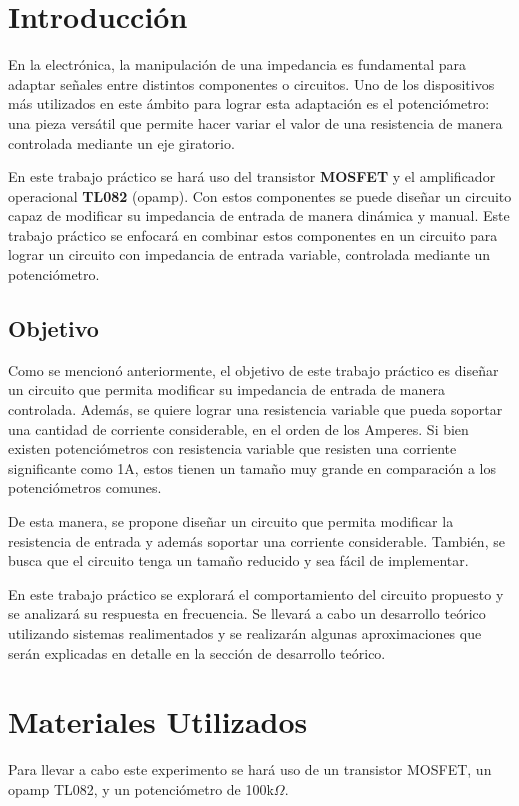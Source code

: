 \documentclass[12pt,oneside,a4paper]{article}
\begin{document}
\newpage

\tableofcontents

\newpage

\section{Introducción}
En la electrónica, la manipulación de una impedancia es fundamental para adaptar señales 
entre distintos componentes o circuitos. Uno de los dispositivos más utilizados en este ámbito 
para lograr esta adaptación es el potenciómetro: una pieza versátil que permite hacer variar el valor 
de una resistencia de manera controlada mediante un eje giratorio. 

En este trabajo práctico se hará uso del transistor \textbf{MOSFET} y el amplificador 
operacional \textbf{TL082} (opamp). Con estos componentes se puede diseñar un circuito capaz de modificar su impedancia 
de entrada de manera dinámica y manual. Este trabajo práctico se enfocará en combinar estos componentes 
en un circuito para lograr un circuito con impedancia de entrada variable, controlada mediante un potenciómetro.

\subsection*{Objetivo}
Como se mencionó anteriormente, el objetivo de este trabajo práctico es diseñar un circuito 
que permita modificar su impedancia de entrada de manera controlada. Además, se quiere lograr 
una resistencia variable que pueda soportar una cantidad de corriente considerable, en el orden de los 
Amperes. Si bien existen potenciómetros con resistencia variable que resisten una corriente significante como 
1A, estos tienen un tamaño muy grande en comparación a los potenciómetros comunes.

De esta manera, se propone diseñar un circuito que permita modificar la resistencia de entrada 
y además soportar una corriente considerable. También, se busca que el circuito tenga un tamaño
reducido y sea fácil de implementar.

En este trabajo práctico se explorará el comportamiento del circuito propuesto y se analizará
su respuesta en frecuencia. Se llevará a cabo un desarrollo teórico utilizando sistemas 
realimentados y se realizarán algunas aproximaciones que serán explicadas en detalle en la 
sección de desarrollo teórico.

\section{Materiales Utilizados}
Para llevar a cabo este experimento se hará uso de un transistor MOSFET, un opamp TL082, y un potenciómetro
de 100k$\Omega$.
\end{document}
